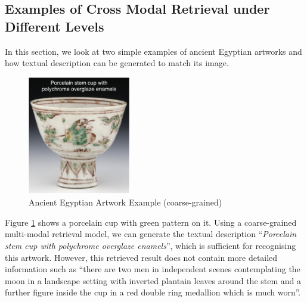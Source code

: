 \subsection{Examples of Cross Modal Retrieval under Different Levels}
In this section, we look at two simple examples of ancient Egyptian artworks and how textual description can be generated to match its image.

\begin{figure}[h!]
\centering
\includegraphics[width=0.4\textwidth]{artwork_fine1.pdf}
\caption{Ancient Egyptian Artwork Example (coarse-grained)}
\label{fig:artwork1}
\end{figure}

Figure \ref{fig:artwork1} shows a porcelain cup with green pattern on it. Using a coarse-grained multi-modal retrieval model, we can generate the textual description ``\textit{Porcelain stem cup with polychrome overglaze enamels}'', which is sufficient for recognising this artwork. However, this retrieved result does not contain more detailed information such as ``there are two men in independent scenes contemplating the moon in a landscape setting with inverted plantain leaves around the stem and a further figure inside the cup in a red double ring medallion which is much worn''. 

